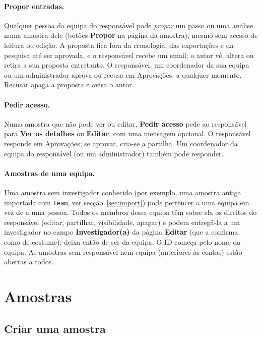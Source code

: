 \documentclass[11pt,a4paper]{article}
\newcommand{\ui}[1]{\textsf{\textbf{#1}}}
\newcommand{\menu}[1]{\textsf{#1}}
\begin{document}
\paragraph{Propor entradas.} Qualquer pessoa da equipa do responsável pode
\emph{propor} um passo ou uma análise numa amostra dele (botões \ui{Propor}
na página da amostra), mesmo sem acesso de leitura ou edição. A proposta fica
fora da cronologia, das exportações e da pesquisa até ser aprovada, e o
responsável recebe um email; o autor vê, altera ou retira a sua proposta
entretanto. O responsável, um coordenador da sua equipa ou um administrador
aprova ou recusa em \menu{Aprovações}, a qualquer momento. Recusar apaga a
proposta e avisa o autor.

\paragraph{Pedir acesso.} Numa amostra que não pode ver ou editar,
\ui{Pedir acesso} pede ao responsável para \ui{Ver os detalhes} ou
\ui{Editar}, com uma mensagem opcional. O responsável responde em
\menu{Aprovações}; se aprovar, cria-se a partilha. Um coordenador da equipa do
responsável (ou um administrador) também pode responder.

\paragraph{Amostras de uma equipa.} Uma amostra sem investigador conhecido
(por exemplo, uma amostra antiga importada com \texttt{team}, ver
secção~\ref{sec:import}) pode pertencer a uma equipa em vez de a uma pessoa.
Todos os membros dessa equipa têm sobre ela os direitos do responsável
(editar, partilhar, visibilidade, apagar) e podem entregá-la a um
investigador no campo \ui{Investigador(a)} da página \ui{Editar} (que a
confirma, como de costume); deixa então de ser da equipa. O ID começa pelo
nome da equipa. As amostras sem responsável nem equipa (anteriores às
contas) estão abertas a todos.

\section{Amostras}

\subsection{Criar uma amostra}
\end{document}
